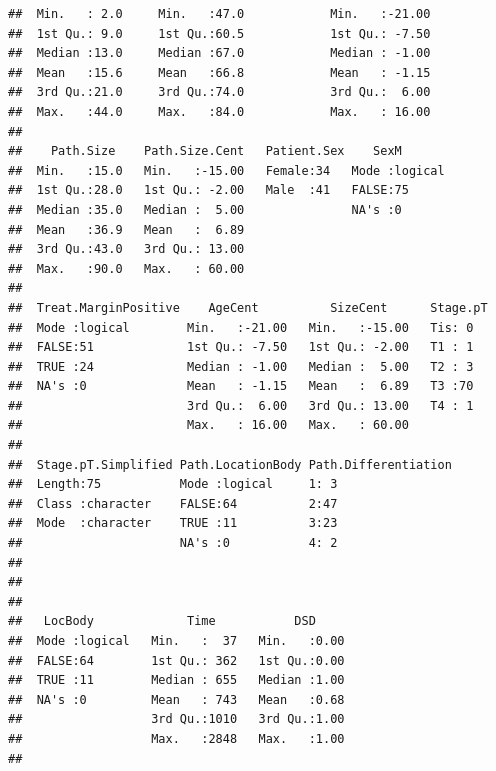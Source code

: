 \documentclass{article}\usepackage[]{graphicx}\usepackage[]{color}
\makeatletter
\newenvironment{kframe}{%
 \def\at@end@of@kframe{}%
 \ifinner\ifhmode%
  \def\at@end@of@kframe{\end{minipage}}%
  \begin{minipage}{\columnwidth}%
 \fi\fi%
 \def\FrameCommand##1{\hskip\@totalleftmargin \hskip-\fboxsep
 \colorbox{shadecolor}{##1}\hskip-\fboxsep
     \hskip-\linewidth \hskip-\@totalleftmargin \hskip\columnwidth}%
 \MakeFramed {\advance\hsize-\width
   \@totalleftmargin\z@ \linewidth\hsize
   \@setminipage}}%
 {\par\unskip\endMakeFramed%
 \at@end@of@kframe}
\newenvironment{knitrout}{}{} %
\makeatother
\begin{document}
\begin{knitrout}
\begin{kframe}
\begin{verbatim}
##  Min.   : 2.0     Min.   :47.0            Min.   :-21.00              
##  1st Qu.: 9.0     1st Qu.:60.5            1st Qu.: -7.50              
##  Median :13.0     Median :67.0            Median : -1.00              
##  Mean   :15.6     Mean   :66.8            Mean   : -1.15              
##  3rd Qu.:21.0     3rd Qu.:74.0            3rd Qu.:  6.00              
##  Max.   :44.0     Max.   :84.0            Max.   : 16.00              
##                                                                       
##    Path.Size    Path.Size.Cent   Patient.Sex    SexM        
##  Min.   :15.0   Min.   :-15.00   Female:34   Mode :logical  
##  1st Qu.:28.0   1st Qu.: -2.00   Male  :41   FALSE:75       
##  Median :35.0   Median :  5.00               NA's :0        
##  Mean   :36.9   Mean   :  6.89                              
##  3rd Qu.:43.0   3rd Qu.: 13.00                              
##  Max.   :90.0   Max.   : 60.00                              
##                                                             
##  Treat.MarginPositive    AgeCent          SizeCent      Stage.pT
##  Mode :logical        Min.   :-21.00   Min.   :-15.00   Tis: 0  
##  FALSE:51             1st Qu.: -7.50   1st Qu.: -2.00   T1 : 1  
##  TRUE :24             Median : -1.00   Median :  5.00   T2 : 3  
##  NA's :0              Mean   : -1.15   Mean   :  6.89   T3 :70  
##                       3rd Qu.:  6.00   3rd Qu.: 13.00   T4 : 1  
##                       Max.   : 16.00   Max.   : 60.00           
##                                                                 
##  Stage.pT.Simplified Path.LocationBody Path.Differentiation
##  Length:75           Mode :logical     1: 3                
##  Class :character    FALSE:64          2:47                
##  Mode  :character    TRUE :11          3:23                
##                      NA's :0           4: 2                
##                                                            
##                                                            
##                                                            
##   LocBody             Time           DSD      
##  Mode :logical   Min.   :  37   Min.   :0.00  
##  FALSE:64        1st Qu.: 362   1st Qu.:0.00  
##  TRUE :11        Median : 655   Median :1.00  
##  NA's :0         Mean   : 743   Mean   :0.68  
##                  3rd Qu.:1010   3rd Qu.:1.00  
##                  Max.   :2848   Max.   :1.00  
## 
\end{verbatim}
\begin{alltt}

\end{alltt}
\end{kframe}
\end{knitrout}
\end{document}
